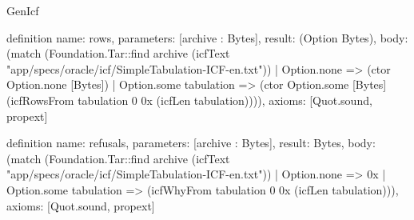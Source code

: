 \begin{lexlean}{GenIcf}
\begin{semanticmodule}
definition{
  name: rows,
  parameters: [archive : Bytes],
  result: (Option Bytes),
  body: (match (Foundation.Tar::find archive (icfText "app/specs/oracle/icf/SimpleTabulation-ICF-en.txt"))
    | Option.none => (ctor Option.none [Bytes])
    | Option.some tabulation => (ctor Option.some [Bytes] (icfRowsFrom tabulation 0 0x (icfLen tabulation)))),
  axioms: [Quot.sound, propext]
}

definition{
  name: refusals,
  parameters: [archive : Bytes],
  result: Bytes,
  body: (match (Foundation.Tar::find archive (icfText "app/specs/oracle/icf/SimpleTabulation-ICF-en.txt"))
    | Option.none => 0x
    | Option.some tabulation => (icfWhyFrom tabulation 0 0x (icfLen tabulation))),
  axioms: [Quot.sound, propext]
}
\end{semanticmodule}
\end{lexlean}
